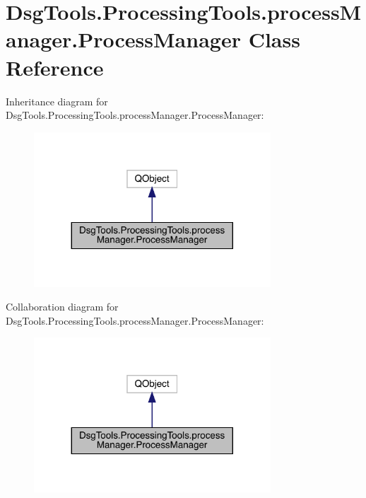\hypertarget{class_dsg_tools_1_1_processing_tools_1_1process_manager_1_1_process_manager}{}\section{Dsg\+Tools.\+Processing\+Tools.\+process\+Manager.\+Process\+Manager Class Reference}
\label{class_dsg_tools_1_1_processing_tools_1_1process_manager_1_1_process_manager}


Inheritance diagram for Dsg\+Tools.\+Processing\+Tools.\+process\+Manager.\+Process\+Manager\+:
\nopagebreak
\begin{figure}[H]
\begin{center}
\leavevmode
\includegraphics[width=251pt]{class_dsg_tools_1_1_processing_tools_1_1process_manager_1_1_process_manager__inherit__graph}
\end{center}
\end{figure}


Collaboration diagram for Dsg\+Tools.\+Processing\+Tools.\+process\+Manager.\+Process\+Manager\+:
\nopagebreak
\begin{figure}[H]
\begin{center}
\leavevmode
\includegraphics[width=251pt]{class_dsg_tools_1_1_processing_tools_1_1process_manager_1_1_process_manager__coll__graph}
\end{center}
\end{figure}
